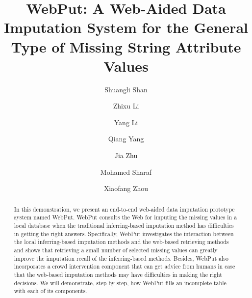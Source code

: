 \documentclass[sigconf]{acmart}
\begin{document}
\small
\title{WebPut: A Web-Aided Data Imputation System for the General Type of Missing String Attribute Values}

\author{Shuangli Shan}

\author{Zhixu Li}

\author{Yang Li}

\author{Qiang Yang}

\author{Jia Zhu}

\author{Mohamed Sharaf}

\author{Xiaofang Zhou}



\begin{abstract}
In this demonstration, we present an end-to-end web-aided data imputation prototype system named WebPut. WebPut consults the Web for imputing the missing values in a local database when the traditional inferring-based imputation method has difficulties in getting the right answers.
%
Specifically, WebPut investigates the interaction between the local inferring-based imputation methods and the web-based retrieving methods and shows that retrieving a small number of selected missing values can greatly improve the imputation recall of the inferring-based methods.
%
Besides, WebPut also incorporates a crowd intervention component that can get advice from humans in case that the web-based imputation methods may have difficulties in making the right decisions.
%
We will demonstrate, step by step, how WebPut fills an incomplete table with each of its components. %
\end{abstract}
\end{document}

